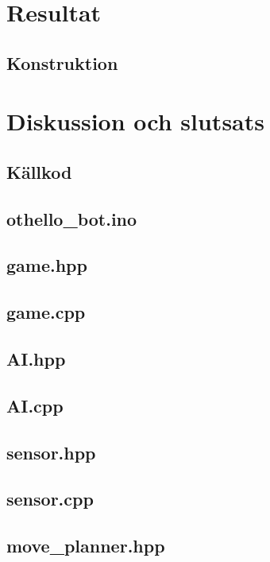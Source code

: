 \documentclass[a4paper]{article}
\begin{document}
\section{Resultat}
\subsection{Konstruktion}

\section{Diskussion och slutsats}

\pagebreak
\begin{appendix}
\section{Källkod} \label{code}
\subsection{othello\_bot.ino}

\subsection{game.hpp}

\subsection{game.cpp}

\subsection{AI.hpp}

\subsection{AI.cpp}

\subsection{sensor.hpp}

\subsection{sensor.cpp}

\subsection{move\_planner.hpp}


\end{appendix}
\end{document}
